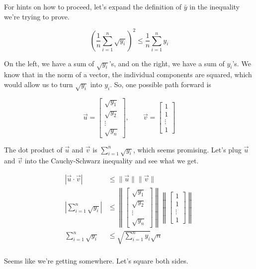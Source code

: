 \documentclass[11pt]{article}
\begin{document}
\begin{prob}[(20 pts)]
\begin{subprob}
\begin{solution}
For hints on how to proceed, let's expand the definition of $\bar y$ in the inequality we're trying to prove.

$$\left( \frac{1}{n} \sum_{i=1}^n \sqrt{y_i} \right)^2 \leq \frac{1}{n} \sum_{i=1}^n y_i$$

On the left, we have a sum of $\sqrt{y_i}$'s, and on the right, we have a sum of $y_i$'s. We know that in the norm of a vector, the individual components are squared, which would allow us to turn $\sqrt{y_i}$ into $y_i$. So, one possible path forward is

$$\vec u = \begin{bmatrix} \sqrt{y_1} \\ \sqrt{y_2} \\ \vdots \\ \sqrt{y_n} \end{bmatrix}, \qquad \vec v = \begin{bmatrix} 1 \\ 1 \\ \vdots \\ 1 \end{bmatrix}$$

The dot product of $\vec u$ and $\vec v$ is $\sum_{i=1}^n \sqrt{y_i}$, which seems promising. Let's plug $\vec u$ and $\vec v$ into the Cauchy-Schwarz inequality and see what we get.

\begin{align*}
  \left| \vec u \cdot \vec v \right| &\leq \lVert \vec u \rVert \lVert \vec v \rVert \\
  \left| \sum_{i=1}^n \sqrt{y_i} \right| &\leq \left \lVert \begin{bmatrix} \sqrt{y_1} \\ \sqrt{y_2} \\ \vdots \\ \sqrt{y_n} \end{bmatrix} \right \rVert \left \lVert \begin{bmatrix} 1 \\ 1 \\ \vdots \\ 1 \end{bmatrix} \right \rVert \\
  \sum_{i=1}^n \sqrt{y_i} &\leq \sqrt{\sum_{i=1}^n y_i} \sqrt{n} \\
\end{align*}

\newpage

Seems like we're getting somewhere. Let's square both sides.


\end{solution}
\end{subprob}
\end{prob}
\end{document}
